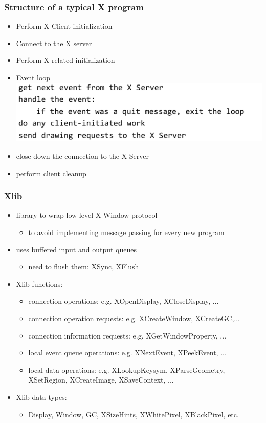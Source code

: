 \documentclass[twoside]{article}
\begin{document}
\subsubsection{Structure of a typical X program}
\begin{itemize}
\item Perform X Client initialization
\item Connect to the X server
\item Perform X related initialization 
\item Event loop \\
\includegraphics[scale=0.3]{2}
\item close down the connection to the X Server
\item perform client cleanup
\end{itemize}

\subsubsection{Xlib}
\begin{itemize}
\item library to wrap low level X Window protocol
\begin{itemize}
\item to avoid implementing message passing for every new program
\end{itemize}
\item uses buffered input and output queues 
\begin{itemize}
\item need to flush them: XSync, XFlush
\end{itemize}
\item Xlib functions:
\begin{itemize}
\item connection operations: e.g. XOpenDisplay, XCloseDisplay, ...
\item connection operation requests: e.g. XCreateWindow, XCreateGC,...
\item connection information requests: e.g. XGetWindowProperty, ...
\item local event queue operations: e.g. XNextEvent, XPeekEvent, ...
\item local data operations: e.g. XLookupKeysym, XParseGeometry, XSetRegion, XCreateImage, XSaveContext, ...
\end{itemize}
\item Xlib data types:
\begin{itemize}
\item Display, Window, GC, XSizeHints, XWhitePixel, XBlackPixel, etc.
\end{itemize} 
\end{itemize}
\end{document}
